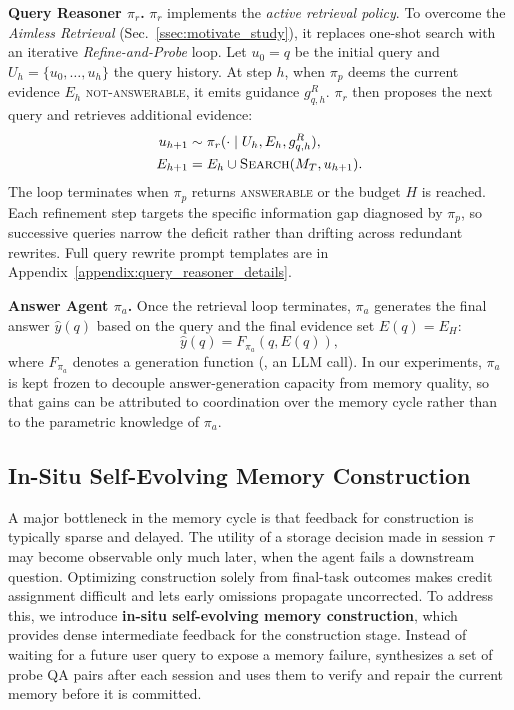 \noindent\textbf{Query Reasoner $\pi_r$.}
$\pi_r$ implements the \emph{active retrieval policy}.
To overcome the \emph{Aimless Retrieval} (Sec.~\ref{ssec:motivate_study}),
it replaces one-shot search with an iterative \emph{Refine-and-Probe} loop.
Let $u_0=q$ be the initial query and $U_h=\{u_0,\ldots,u_h\}$ the query history.
At step $h$, when $\pi_p$ deems the current evidence $E_h$ \textsc{not-answerable}, it emits guidance $g_{q,h}^{R}$.
$\pi_r$ then proposes the next query and retrieves additional evidence:
\begin{equation}
\begin{aligned}
u_{h+1} &\sim \pi_r(\cdot \mid U_h, E_h, g_{q,h}^{R}),\\
E_{h+1} &= E_h \cup \textsc{Search}(M_T, u_{h+1}).
\end{aligned}
\label{eq:query_reasoner}
\end{equation}
The loop terminates when $\pi_p$ returns \textsc{answerable} or the budget $H$ is reached.
Each refinement step targets the specific information gap diagnosed by $\pi_p$, so successive queries narrow the deficit rather than drifting across redundant rewrites. Full query rewrite prompt templates are in Appendix~\ref{appendix:query_reasoner_details}.


\noindent\textbf{Answer Agent $\pi_a$.}
Once the retrieval loop terminates, $\pi_a$ generates the final answer $\hat{y}(q)$ based on the query and the final evidence set $E(q)=E_H$:
\begin{equation}
\hat{y}(q) = F_{\pi_a}(q, E(q)),
\end{equation}
where $F_{\pi_a}$ denotes a generation function (\eg, an LLM call).
In our experiments, $\pi_a$ is kept frozen to decouple answer-generation capacity from memory quality, so that gains can be attributed to coordination over the memory cycle rather than to the parametric knowledge of $\pi_a$.

\subsection{In-Situ Self-Evolving Memory Construction}
\label{ssec:self_evolving_construction}
A major bottleneck in the memory cycle is that feedback for construction is typically sparse and delayed.
The utility of a storage decision made in session $\tau$ may become observable only much later, when the agent fails a downstream question.
Optimizing construction solely from final-task outcomes makes credit assignment difficult and lets early omissions propagate uncorrected. To address this, we introduce \textbf{in-situ self-evolving memory construction}, which provides dense intermediate feedback for the construction stage.
Instead of waiting for a future user query to expose a memory failure, \method synthesizes a set of probe QA pairs after each session and uses them to verify and repair the current memory before it is committed.

